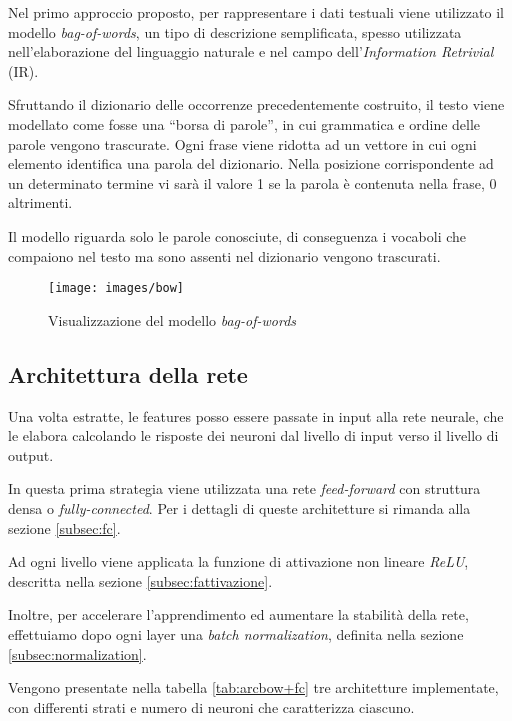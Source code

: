 Nel primo approccio proposto, per rappresentare i dati testuali viene utilizzato il modello \emph{bag-of-words}, un tipo di descrizione semplificata, spesso utilizzata nell'elaborazione del linguaggio naturale e nel campo dell'\emph{Information Retrivial} (IR). 

Sfruttando il dizionario delle occorrenze precedentemente costruito, il testo viene modellato  come fosse una ``borsa di parole'', in cui grammatica e ordine delle parole vengono trascurate.
Ogni frase viene ridotta ad un vettore in cui ogni elemento identifica una parola del dizionario. Nella posizione corrispondente ad un determinato termine vi sarà il valore \num{1} se la parola è contenuta nella frase, \num{0} altrimenti.

Il modello riguarda solo le parole conosciute, di conseguenza i vocaboli che compaiono nel testo ma sono assenti nel dizionario vengono trascurati.

\begin{figure}[H]
	\centering
	{\texttt{[image: images/bow]}}
	\caption{Visualizzazione del modello \emph{bag-of-words}}
	\label{fig:bow}
\end{figure}

\subsection{Architettura della rete}
\label{subsec:modelli1}

Una volta estratte, le features posso essere passate in input alla rete neurale, che le elabora calcolando le risposte dei neuroni dal livello di input verso il livello di output.

In questa prima strategia viene utilizzata una rete \emph{feed-forward} con struttura densa o \emph{fully-connected}. Per i dettagli di queste architetture si rimanda alla sezione \ref{subsec:fc}.

Ad ogni livello viene applicata la funzione di attivazione non lineare \emph{ReLU}, descritta nella sezione \ref{subsec:fattivazione}.

Inoltre, per accelerare l'apprendimento ed aumentare la stabilità della rete, effettuiamo dopo ogni layer una \emph{batch normalization}, definita nella sezione \ref{subsec:normalization}. 

Vengono presentate nella tabella \ref{tab:arcbow+fc} tre architetture implementate, con differenti strati e numero di neuroni che caratterizza ciascuno.


